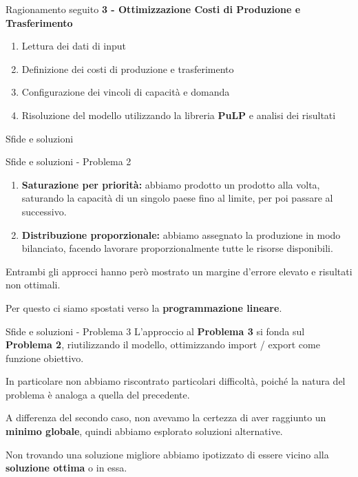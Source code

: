 \documentclass{beamer}
\begin{document}
\begin{frame}{Ragionamento seguito}
    \textbf{3 - Ottimizzazione Costi di Produzione e Trasferimento}
    \begin{enumerate}
        \item Lettura dei dati di input
        \item Definizione dei costi di produzione e trasferimento
        \item Configurazione dei vincoli di capacità e domanda
        \item Risoluzione del modello utilizzando la libreria \textbf{PuLP} e analisi dei risultati
    \end{enumerate}
\end{frame}

\begin{frame}{Sfide e soluzioni}




\end{frame}


\begin{frame}{Sfide e soluzioni - Problema 2}
    

    \vspace{0.3cm}
    \begin{enumerate}
        \item \textbf{Saturazione per priorità:} abbiamo prodotto un prodotto alla volta, saturando la capacità di un singolo paese fino al limite, per poi passare al successivo.
        \vspace{0.2cm}
        \item \textbf{Distribuzione proporzionale:} abbiamo assegnato la produzione in modo bilanciato, facendo lavorare proporzionalmente tutte le risorse disponibili.
    \end{enumerate}

    \vspace{0.4cm}
    Entrambi gli approcci hanno però mostrato un margine d’errore elevato e risultati non ottimali.

    \vspace{0.4cm}
    Per questo ci siamo spostati verso la \textbf{programmazione lineare}.
\end{frame}

\begin{frame}{Sfide e soluzioni - Problema 3}
    L'approccio al \textbf{Problema 3} si fonda sul \textbf{Problema 2}, riutilizzando il modello, ottimizzando import / export come funzione obiettivo.

    \vspace{0.4cm}
    In particolare non abbiamo riscontrato particolari difficoltà, poiché la natura del problema è analoga a quella del precedente.

    \vspace{0.4cm}
    A differenza del secondo caso, non avevamo la certezza di aver raggiunto un \textbf{minimo globale}, quindi abbiamo esplorato soluzioni alternative.

    \vspace{0.4cm}
    Non trovando una soluzione migliore abbiamo ipotizzato di essere vicino alla \textbf{soluzione ottima} o in essa.
\end{frame}
\end{document}
